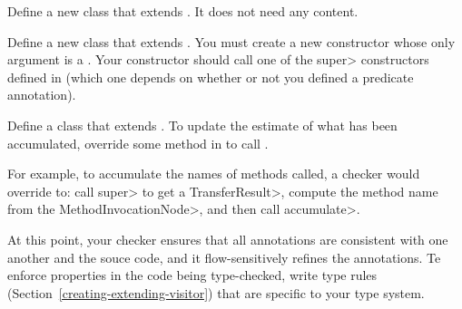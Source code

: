 
Define a new class that extends .
It does not need any content.

Define a new class that extends .
You must create a new constructor whose only argument is a .
Your constructor should call one of the \<super> constructors defined in
 (which one depends on whether or not
you defined a predicate annotation).



Define a class that extends .
To update the estimate of what has been accumulated, override some method in
 to call
.

For example, to accumulate the names of methods called, a checker would override
 to:
call \<super> to get a \<TransferResult>, compute the method name from the \<MethodInvocationNode>,
and then call \<accumulate>.



At this point, your checker ensures that all annotations are consistent
with one another and the souce code, and it flow-sensitively refines the
annotations.
Te enforce properties in the code being type-checked, write type rules
(Section~\ref{creating-extending-visitor}) that are specific to your type
system.


